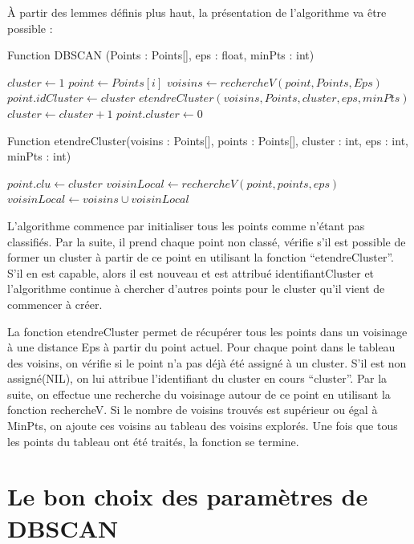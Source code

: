 \documentclass[
  oneside]{memoire-umons}
\begin{document}
À partir des lemmes définis plus haut, la présentation de l'algorithme
va être possible :

Function DBSCAN (Points : Points{[}{]}, eps : float, minPts : int)

\begin{algorithmic}
\State $cluster \gets 1$
\State $point \gets Points[i]$
\State $voisins \gets rechercheV(point, Points,Eps)$
\State $point.idCluster \gets cluster$
\State $etendreCluster(voisins,Points, cluster,eps, minPts)$
\State $cluster \gets cluster+1$
\Else
\State $point.cluster \gets 0$
\EndIf
\EndIf
\EndFor
\end{algorithmic}

Function etendreCluster(voisins : Points{[}{]}, points : Points{[}{]},
cluster : int, eps : int, minPts : int)

\begin{algorithmic}
\State $point.clu \gets cluster$
\State $voisinLocal \gets rechercheV(point, points, eps)$
\State $voisinLocal \gets voisins \cup voisinLocal$
\EndIf
\EndIf
\EndFor
\end{algorithmic}

L'algorithme commence par initialiser tous les points comme n'étant pas
classifiés. Par la suite, il prend chaque point non classé, vérifie s'il
est possible de former un cluster à partir de ce point en utilisant la
fonction ``etendreCluster''. S'il en est capable, alors il est nouveau
et est attribué identifiantCluster et l'algorithme continue à chercher
d'autres points pour le cluster qu'il vient de commencer à créer.

La fonction etendreCluster permet de récupérer tous les points dans un
voisinage à une distance Eps à partir du point actuel. Pour chaque point
dans le tableau des voisins, on vérifie si le point n'a pas déjà été
assigné à un cluster. S'il est non assigné(NIL), on lui attribue
l'identifiant du cluster en cours ``cluster''. Par la suite, on effectue
une recherche du voisinage autour de ce point en utilisant la fonction
rechercheV. Si le nombre de voisins trouvés est supérieur ou égal à
MinPts, on ajoute ces voisins au tableau des voisins explorés. Une fois
que tous les points du tableau ont été traités, la fonction se termine.

\chapter{Le bon choix des paramètres de DBSCAN}
\end{document}
